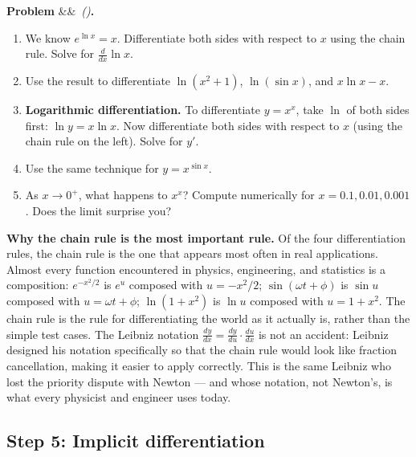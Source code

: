 \documentclass[12pt, a4paper]{article}
\newcounter{problem}
\newenvironment{problem}[1][]{%
  \refstepcounter{problem}%
  \par\vspace{6pt}%
  \noindent\textbf{\color{MidBlue}Problem \theproblem}%
  \ifx&#1&\else\ \textit{(#1)}\fi\textbf{.}\enskip
}{\par\vspace{4pt}}
\begin{document}
\begin{problem}
\label{prob:log_deriv}
\begin{enumerate}[label=(\alph*), topsep=2pt]
  \item We know $e^{\ln x} = x$. Differentiate both sides with respect to $x$ using the chain rule. Solve for $\frac{d}{dx}\ln x$.
  \item Use the result to differentiate $\ln(x^2 + 1)$, $\ln(\sin x)$, and $x \ln x - x$.
  \item \textbf{Logarithmic differentiation.} To differentiate $y = x^x$, take $\ln$ of both sides first: $\ln y = x \ln x$. Now differentiate both sides with respect to $x$ (using the chain rule on the left). Solve for $y'$.
  \item Use the same technique for $y = x^{\sin x}$.
  \item As $x \to 0^+$, what happens to $x^x$? Compute numerically for $x = 0.1, 0.01, 0.001$. Does the limit surprise you?
\end{enumerate}
\end{problem}

\begin{thought}
\textbf{Why the chain rule is the most important rule.}
Of the four differentiation rules, the chain rule is the one that appears most often in real applications. Almost every function encountered in physics, engineering, and statistics is a composition: $e^{-x^2/2}$ is $e^u$ composed with $u = -x^2/2$; $\sin(\omega t + \phi)$ is $\sin u$ composed with $u = \omega t + \phi$; $\ln(1+x^2)$ is $\ln u$ composed with $u = 1+x^2$. The chain rule is the rule for differentiating the world as it actually is, rather than the simple test cases. The Leibniz notation $\frac{dy}{dx} = \frac{dy}{du}\cdot\frac{du}{dx}$ is not an accident: Leibniz designed his notation specifically so that the chain rule would look like fraction cancellation, making it easier to apply correctly. This is the same Leibniz who lost the priority dispute with Newton --- and whose notation, not Newton's, is what every physicist and engineer uses today.
\end{thought}

\subsection{Step 5: Implicit differentiation}
\end{document}
